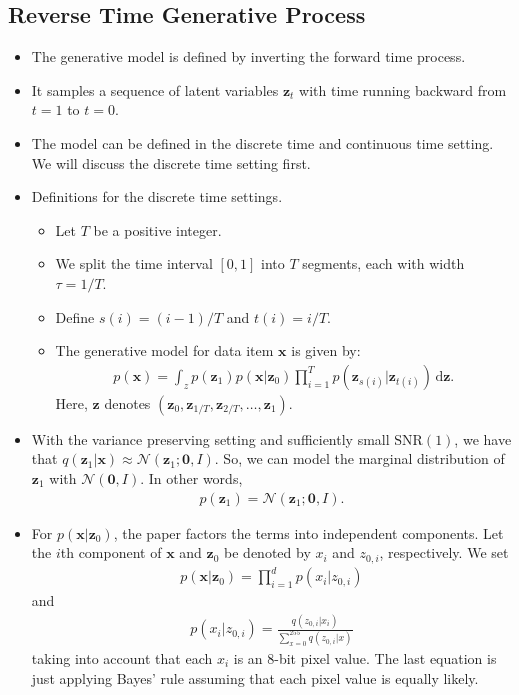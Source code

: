 \documentclass[10pt]{article}
\newcommand{\dee}{\mathrm{d}}
\newcommand{\ve}[1]{\mathbf{#1}}
\newcommand{\N}{\mathcal{N}}
\newcommand{\SNR}{\mathrm{SNR}}
\begin{document}
\subsection{Reverse Time Generative Process}

\begin{itemize}
  \item The generative model is defined by inverting the forward time process.
  
  \item It samples a sequence of latent variables $\ve{z}_t$ with time running backward from $t = 1$ to $t = 0$.

  \item The model can be defined in the discrete time and continuous time setting. We will discuss the discrete time setting first.
  
  \item Definitions for the discrete time settings.
  \begin{itemize}
    \item Let $T$ be a positive integer. 
    \item We split the time interval $[0,1]$ into $T$ segments, each with width $\tau = 1/T$.
    \item Define $s(i) = (i-1)/T$ and $t(i) = i/T$.
    \item The generative model for data item $\ve{x}$ is given by:
    \begin{align*}
      p(\ve{x}) = \int_{z} p(\ve{z}_1) p(\ve{x}|\ve{z}_0) \prod_{i=1}^T p(\ve{z}_{s(i)}|\ve{z}_{t(i)})\, \dee\ve{z}.
    \end{align*}
    Here, $\ve{z}$ denotes $(\ve{z}_0, \ve{z}_{1/T}, \ve{z}_{2/T}, \dotsc, \ve{z}_1)$.
  \end{itemize}

  \item With the variance preserving setting and sufficiently small $\SNR(1)$, we have that $q(\ve{z}_1|\ve{x}) \approx \N(\ve{z}_1 ; \ve{0}, I)$. So, we can model the marginal distribution of $\ve{z}_1$ with $\N(\ve{0},I)$. In other words,
  \begin{align*}
    p({\ve{z}_1}) = \N(\ve{z}_1; \ve{0}, I).
  \end{align*}

  \item For $p(\ve{x}|\ve{z}_0)$, the paper factors the terms into independent components. Let the $i$th component of $\ve{x}$ and $\ve{z}_0$ be denoted by $x_i$ and $z_{0,i}$, respectively. We set
  \begin{align*}
    p(\ve{x}|\ve{z}_0) = \prod_{i=1}^d p(x_i|z_{0,i})
  \end{align*}
  and 
  \begin{align*}
    p(x_i | z_{0,i}) = \frac{q(z_{0,i}|x_i)}{\sum_{x=0}^{255} q(z_{0,i}| x)}
  \end{align*}
  taking into account that each $x_{i}$ is an 8-bit pixel value. The last equation is just applying Bayes' rule assuming that each pixel value is equally likely.


\end{itemize}
\end{document}
